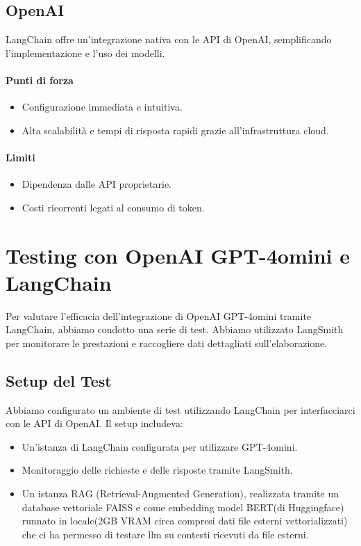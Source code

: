 \documentclass{article}
\begin{document}
\subsection{OpenAI}
LangChain offre un'integrazione nativa con le API di OpenAI, semplificando l'implementazione e l'uso dei modelli.

\paragraph*{Punti di forza}
\begin{itemize}
    \item Configurazione immediata e intuitiva.
    \item Alta scalabilità e tempi di risposta rapidi grazie all'infrastruttura cloud.
\end{itemize}

\paragraph*{Limiti}
\begin{itemize}
    \item Dipendenza dalle API proprietarie.
    \item Costi ricorrenti legati al consumo di token.
\end{itemize}


\section{Testing con OpenAI GPT-4omini e LangChain}
Per valutare l'efficacia dell'integrazione di OpenAI GPT-4omini tramite LangChain, abbiamo condotto una serie di test. Abbiamo utilizzato LangSmith per monitorare le prestazioni e raccogliere dati dettagliati sull'elaborazione.

\subsection{Setup del Test}
Abbiamo configurato un ambiente di test utilizzando LangChain per interfacciarci con le API di OpenAI. Il setup includeva:
\begin{itemize}
    \item Un'istanza di LangChain configurata per utilizzare GPT-4omini.
    \item Monitoraggio delle richieste e delle risposte tramite LangSmith.
    \item Un istanza RAG (Retrieval-Augmented Generation), realizzata tramite un database vettoriale FAISS e come embedding model BERT(di Huggingface) runnato in locale(2GB VRAM circa compresi dati file esterni vettorializzati) che ci ha permesso di testare llm su contesti ricevuti da file esterni.
\end{itemize}
\end{document}
